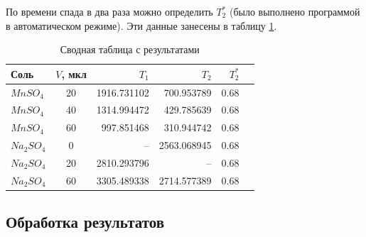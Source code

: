 По времени спада в два раза можно определить $ T_2^* $ (было выполнено программой в автоматическом режиме). Эти данные занесены в таблицу \ref{table:all-T}.



\begin{table}[ht]
	\caption{Сводная таблица с результатами}
	\label{table:all-T}
	\centering
	\begin{tabular}{|l|c|r|r|r|r|}
		\toprule
		Соль &     $V$, мкл &          $T_1$ &          $T_2$ &  $T_2^*$ \\
		\midrule
		$MnSO_4$  	&  20 &  1916.731102 &   700.953789 &  0.68 \\
		$MnSO_4$  	&  40 &  1314.994472 &   429.785639 &  0.68 \\
		$MnSO_4$ 	&  60 &   997.851468 &   310.944742 &  0.68 \\
		$Na_2 SO_4$ &   0 &          --	 &  2563.068945 &  0.68 \\
		$Na_2 SO_4$ &  20 &  2810.293796 &          --  &  0.68 \\
		$Na_2 SO_4$ &  60 &  3305.489338 &  2714.577389 &  0.68 \\
		\bottomrule
	\end{tabular}
\end{table}

\subsection{Обработка результатов}
